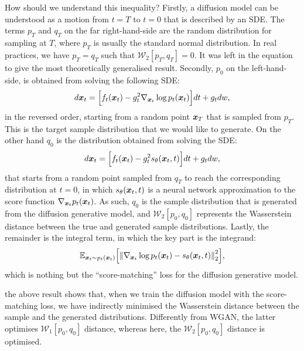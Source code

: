 How should we understand this inequality? Firstly, a diffusion model can be understood as a motion from $t=T$ to $t=0$ that is described by an SDE. The terms $p_T$ and $q_T$ on the far right-hand-side are the random distribution for sampling at $T$, where $p_T$ is usually the standard normal distribution. In real practices, we have $p_T=q_T$ such that $\mathcal{W}_2[p_T,q_T]=0$. It was left in the equation to give the most theoretically generalised result. Secondly, $p_0$ on the left-hand-side, is obtained from solving the following SDE:
\begin{equation}
    \label{eq:16.2}
    d\bm{x}_{t}=\Bigl[f_t(\bm{x}_{t})-g_t^2 \nabla_{\bm{x}_{t}} \log p_t (\bm{x}_{t}) \Bigr]dt +g_t dw,
\end{equation}
in the reversed order, starting from a random point $\bm{x}_T$ that is sampled from $p_T$. This is the target sample distribution that we would like to generate. On the other hand $q_0$ is the distribution obtained from solving the SDE:
\begin{equation}
    \label{eq:16.3}
    d\bm{x}_{t}=\Bigl[f_t(\bm{x}_{t})-g_t^2 s_{\theta}(\bm{x}_{t},t) \Bigr]dt +g_t dw,
\end{equation}
that starts from a random point sampled from $q_T$ to reach the corresponding distribution at $t=0$, in which $s_{\theta}(\bm{x}_{t},t)$ is a neural network approximation to the score function $\nabla_{\bm{x}_{t}}p_t(\bm{x}_{t})$. As such, $q_0$ is the sample distribution that is generated from the diffusion generative model, and $\mathcal{W}_2 [p_0,q_0]$ represents the Wasserstein distance between the true and generated sample distributions. Lastly, the remainder is the integral term, in which the key part is the integrand:
\begin{equation}
    \label{eq:16.4}
     \mathbb{E}_{\bm{x}_{t}\sim p_t (\bm{x}_{t})} \Bigl[ \left\|\nabla_{\bm{x}_{t}}\log p_{t}(\bm{x}_{t})-s_{\theta}(\bm{x}_{t},t)\right\|_2^2\Bigr],
\end{equation}
which is nothing but the ``score-matching'' loss for the diffusion generative model.

the above result shows that, when we train the diffusion model with the score-matching loss, we have indirectly minimised the Wasserstein distance between the sample and the generated distributions. Differently from WGAN, the latter optimises $\mathcal{W}_{1}[p_0,q_0]$ distance, whereas here, the $\mathcal{W}_{2}[p_0,q_0]$ distance is optimised.

